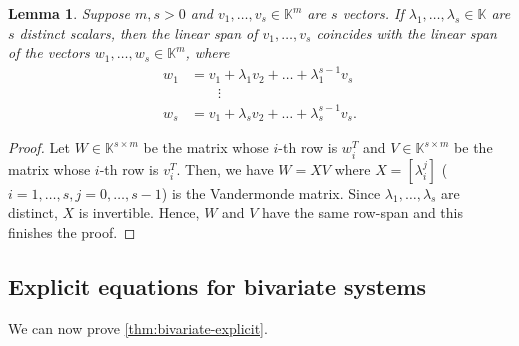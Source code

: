 \documentclass[11pt,a4paper]{article}
\newtheorem{lemma}[theorem]{Lemma}\AddToHook{env/lemma/begin}{\crefalias{theorem}{lemma}}
\numberwithin{equation}{section}
\newcommand{\KK}{\mathbb{K}}
\begin{document}
\begin{lemma}
\label{lem:vandermonde}
Suppose $m, s>0$ and $v_1,\dots,v_s\in\KK^m$ are $s$ vectors.
If $\lambda_1,\dots,\lambda_{s}\in\KK$ are $s$ distinct scalars, then the linear span of $v_1,\dots,v_s$ coincides with the linear span of the vectors
$w_1, \dots, w_s \in \KK^m$, where
 \[
\begin{split}
w_1 &= v_1 + \lambda_1 v_2 + \dots + \lambda_1^{s-1} v_s\\
& \qquad\vdots \\
w_s &= v_1 + \lambda_s v_2 + \dots + \lambda_s^{s-1} v_s.
\end{split}
\]
\end{lemma}
\begin{proof}
    Let $W\in\KK^{s\times m}$ be the matrix whose $i$-th row is $w_i^T$ and $V\in\KK^{s\times m}$ be the matrix whose $i$-th row is $v_i^T$.
    Then, we have $W = X V$ where $X=[\lambda_{i}^j]$ ($i=1,\dots,s, j=0,\dots,s-1$) is the Vandermonde matrix.
    Since $\lambda_1,\dots,\lambda_s$ are distinct, $X$ is invertible.
    Hence, $W$ and $V$ have the same row-span and this finishes the proof.
\end{proof}



\subsection{Explicit equations for bivariate systems}
We can now prove \cref{thm:bivariate-explicit}.

\puncturedbivariate*
\end{document}
